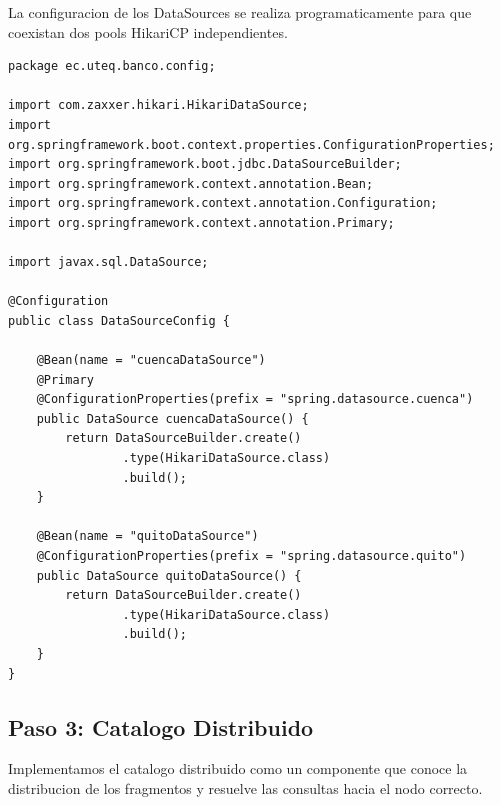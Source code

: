 \documentclass[11pt,a4paper]{article}
\begin{document}
La configuracion de los DataSources se realiza programaticamente para que coexistan dos pools HikariCP independientes.

\begin{lstlisting}[style=JavaStyle,caption={DataSourceConfig.java: configuracion de los dos DataSources}]
package ec.uteq.banco.config;

import com.zaxxer.hikari.HikariDataSource;
import org.springframework.boot.context.properties.ConfigurationProperties;
import org.springframework.boot.jdbc.DataSourceBuilder;
import org.springframework.context.annotation.Bean;
import org.springframework.context.annotation.Configuration;
import org.springframework.context.annotation.Primary;

import javax.sql.DataSource;

@Configuration
public class DataSourceConfig {

    @Bean(name = "cuencaDataSource")
    @Primary
    @ConfigurationProperties(prefix = "spring.datasource.cuenca")
    public DataSource cuencaDataSource() {
        return DataSourceBuilder.create()
                .type(HikariDataSource.class)
                .build();
    }

    @Bean(name = "quitoDataSource")
    @ConfigurationProperties(prefix = "spring.datasource.quito")
    public DataSource quitoDataSource() {
        return DataSourceBuilder.create()
                .type(HikariDataSource.class)
                .build();
    }
}
\end{lstlisting}

\subsection{Paso 3: Catalogo Distribuido}

Implementamos el catalogo distribuido como un componente que conoce la distribucion de los fragmentos y resuelve las consultas hacia el nodo correcto.
\end{document}
